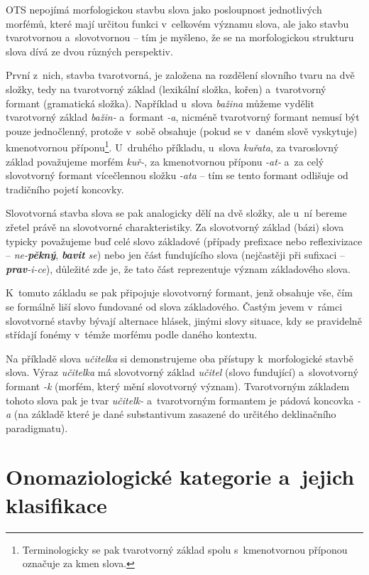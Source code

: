 OTS nepojímá morfologickou stavbu slova jako posloupnost jednotlivých
morfémů, které mají určitou funkci v~celkovém významu slova, ale jako
stavbu tvarotvornou a~slovotvornou -- tím je myšleno, že se na
morfologickou strukturu slova dívá ze dvou různých perspektiv.
\parencite[118]{dokulil62}

První z~nich, stavba tvarotvorná, je založena na rozdělení slovního
tvaru na dvě složky, tedy na tvarotvorný základ (lexikální složka,
kořen) a~tvarotvorný formant (gramatická složka). Například u~slova
\emph{bažina} můžeme vydělit tvarotvorný základ \emph{bažin-} a~formant
\emph{-a}, nicméně tvarotvorný formant nemusí být pouze jednočlenný,
protože v~sobě obsahuje (pokud se v~daném slově vyskytuje) kmenotvornou
příponu\footnote{Terminologicky se pak tvarotvorný základ spolu s~kmenotvornou příponou označuje za kmen slova.}.
U~druhého příkladu, u~slova \emph{kuřata}, za tvaroslovný základ
považujeme morfém \emph{kuř-}, za kmenotvornou příponu \emph{-at-} a~za
celý slovotvorný formant vícečlennou složku \emph{-ata} -- tím se tento
formant odlišuje od tradičního pojetí koncovky.
\parencite{enc-tvar-zaklad17}

Slovotvorná stavba slova se pak analogicky dělí na dvě složky, ale u~ní
bereme zřetel právě na slovotvorné charakteristiky. Za slovotvorný
základ (bázi) slova typicky považujeme buď celé slovo základové (případy
prefixace nebo reflexivizace -- \emph{ne-\textbf{pěkný}},
\emph{\textbf{bavit} se}) nebo jen část fundujícího slova (nejčastěji
při sufixaci -- \emph{\textbf{prav}-i-ce}), důležité zde je, že tato
část reprezentuje význam základového slova.
\parencite{enc-slov-zaklad17}

K~tomuto základu se pak připojuje slovotvorný formant, jenž obsahuje
vše, čím se formálně liší slovo fundované od slova základového. Častým
jevem v~rámci slovotvorné stavby bývají alternace hlásek, jinými slovy
situace, kdy se pravidelně střídají fonémy v~témže morfému podle daného
kontextu.~\parencite[97]{dokulil00}

Na příkladě slova \emph{učitelka} si demonstrujeme oba přístupy
k~morfologické stavbě slova. Výraz \emph{učitelka} má slovotvorný základ
\emph{učitel} (slovo fundující) a~slovotvorný formant \emph{-k} (morfém,
který mění slovotvorný význam). Tvarotvorným základem tohoto slova pak
je tvar \emph{učitelk-} a~tvarotvorným formantem je pádová koncovka
\emph{-a} (na základě které je dané substantivum zasazené do určitého
deklinačního paradigmatu).

\hypertarget{onomaziologickuxe9-kategorie-a-jejich-klasifikace}{%
\section{Onomaziologické kategorie a~jejich
klasifikace}\label{onomaziologickuxe9-kategorie-a-jejich-klasifikace}}


